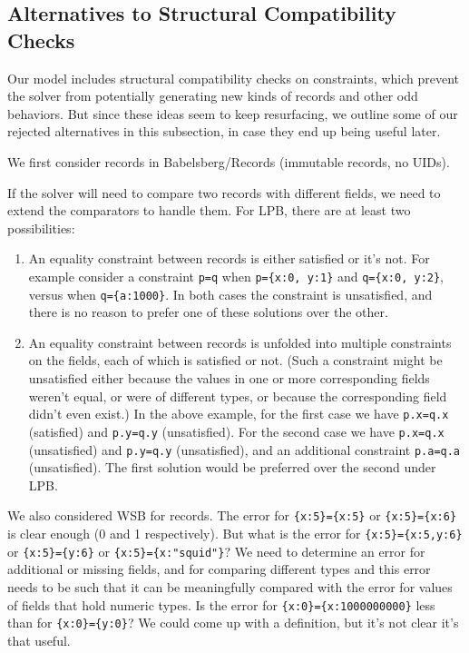 \documentclass{article}
\begin{document}
\subsection{Alternatives to Structural Compatibility Checks}
\label{sec:structural-compatibility-check-alternatives}

Our model includes structural compatibility checks on constraints,
which prevent the solver from potentially generating new kinds of
records and other odd behaviors.  But since these ideas seem to keep
resurfacing, we outline some of our rejected alternatives in this
subsection, in case they end up being useful later.

We first consider records in Babelsberg/Records (immutable records, no UIDs).

If the solver will need to compare two records with different fields, we
need to extend the comparators to handle them.  For LPB, there are at
least two possibilities:
\begin{enumerate}
\item An equality constraint between records is either satisfied or
  it's not. For example consider a constraint \verb|p=q| when
  \verb|p={x:0, y:1}| and \verb|q={x:0, y:2}|, versus when
  \verb|q={a:1000}|.  In both cases the constraint is unsatisfied, and
  there is no reason to prefer one of these solutions over the other.

\item An equality constraint between records is unfolded into multiple
  constraints on the fields, each of which is satisfied or not.  (Such
  a constraint might be unsatisfied either because the values in one
  or more corresponding fields weren't equal, or were of different
  types, or because the corresponding field didn't even exist.)  In
  the above example, for the first case we have \verb|p.x=q.x|
  (satisfied) and \verb|p.y=q.y| (unsatisfied).  For the second case
  we have \verb|p.x=q.x| (unsatisfied) and \verb|p.y=q.y|
  (unsatisfied), and an additional constraint \verb|p.a=q.a|
  (unsatisfied).  The first solution would be preferred over the
  second under LPB.
\end{enumerate}

We also considered WSB for records.  The error for \verb|{x:5}={x:5}|
or \verb|{x:5}={x:6}| is clear enough (0 and 1 respectively).  But
what is the error for \verb|{x:5}={x:5,y:6}| or \verb|{x:5}={y:6}| or
\verb|{x:5}={x:"squid"}|?  We need to determine an error for
additional or missing fields, and for comparing different types and
this error needs to be such that it can be meaningfully compared with
the error for values of fields that hold numeric types.  Is the error
for \verb|{x:0}={x:1000000000}| less than for \verb|{x:0}={y:0}|?  We
could come up with a definition, but it's not clear it's that useful.
\end{document}
